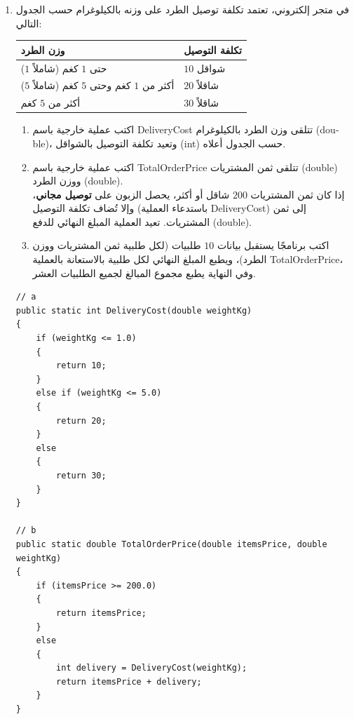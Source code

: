 \documentclass[14pt]{extarticle}
\begin{document}
\begin{enumerate}[resume, itemsep=2em]
\item
في متجر إلكتروني، تعتمد تكلفة توصيل الطرد على وزنه بالكيلوغرام حسب الجدول التالي:
\begin{center}
\renewcommand{\arraystretch}{1.3}
\begin{tabular}{|C{5.5cm}|C{4.5cm}|}
\hline
\textbf{وزن الطرد} & \textbf{تكلفة التوصيل} \\ \hline
حتى $1$ كغم (شاملاً $1$) & $10$ شواقل \\ \hline
أكثر من $1$ كغم وحتى $5$ كغم (شاملاً $5$) & $20$ شاقلاً \\ \hline
أكثر من $5$ كغم & $30$ شاقلاً \\ \hline
\end{tabular}
\end{center}
\begin{enumerate}
    \item اكتب عملية خارجية باسم \textenglish{DeliveryCost} تتلقى وزن الطرد بالكيلوغرام (\textenglish{double})، وتعيد تكلفة التوصيل بالشواقل (\textenglish{int}) حسب الجدول أعلاه.
    \item اكتب عملية خارجية باسم \textenglish{TotalOrderPrice} تتلقى ثمن المشتريات (\textenglish{double}) ووزن الطرد (\textenglish{double}). \\
    إذا كان ثمن المشتريات $200$ شاقل أو أكثر، يحصل الزبون على \textbf{توصيل مجاني}، وإلا تُضاف تكلفة التوصيل (باستدعاء العملية \textenglish{DeliveryCost}) إلى ثمن المشتريات. تعيد العملية المبلغ النهائي للدفع (\textenglish{double}).
    \item اكتب برنامجًا يستقبل بيانات $10$ طلبيات (لكل طلبية ثمن المشتريات ووزن الطرد)، ويطبع المبلغ النهائي لكل طلبية بالاستعانة بالعملية \textenglish{TotalOrderPrice}، وفي النهاية يطبع مجموع المبالغ لجميع الطلبيات العشر.
\end{enumerate}
\ifwithsols
\begin{boxSolution}
\begin{english}
\begin{verbatim}
// a
public static int DeliveryCost(double weightKg)
{
    if (weightKg <= 1.0)
    {
        return 10;
    }
    else if (weightKg <= 5.0)
    {
        return 20;
    }
    else
    {
        return 30;
    }
}

// b
public static double TotalOrderPrice(double itemsPrice, double weightKg)
{
    if (itemsPrice >= 200.0)
    {
        return itemsPrice;
    }
    else
    {
        int delivery = DeliveryCost(weightKg);
        return itemsPrice + delivery;
    }
}
\end{verbatim}
\end{english}
\end{boxSolution}


\end{enumerate}
\end{document}
